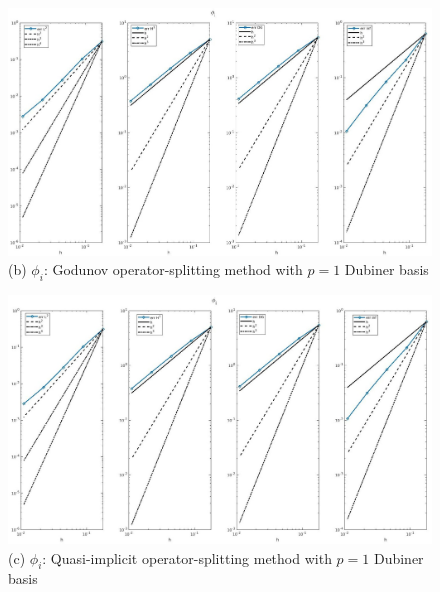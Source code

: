 \documentclass[a4paper,11pt]{article}
\begin{document}
\begin{figure}[h]
\begin{center}
\includegraphics[width =\textwidth]{./D1_Phii_1_GO.jpg}
\caption*{(b) $\phi_i$: Godunov operator-splitting method with $p=1$ Dubiner basis}
\end{center}
\end{figure}
\begin{figure}[H]
\begin{center}
\includegraphics[width =\textwidth]{./D1_Phii_1_OS.jpg}
\caption*{(c) $\phi_i$: Quasi-implicit operator-splitting method with $p=1$ Dubiner basis}
\end{center}
\end{figure}
\newpage
\end{document}
